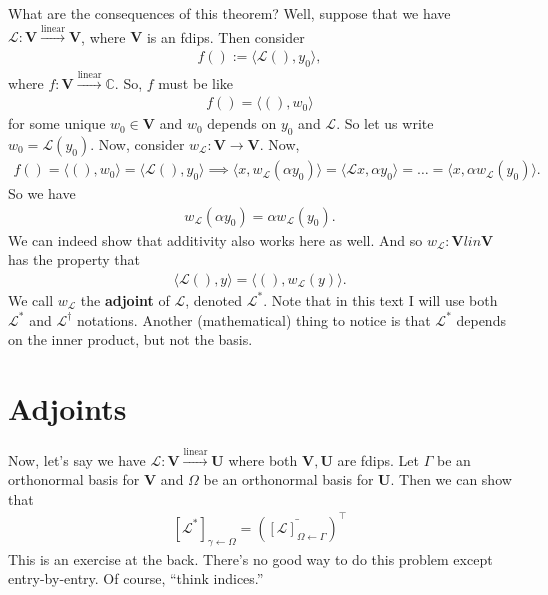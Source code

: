 \documentclass{book}
\theoremstyle{definition}
\newcommand{\C}{\mathbb{C}}
\newcommand{\V}{\mathbf{V}}
\newcommand{\U}{\mathbf{U}}
\newcommand{\lag}{\mathcal{L}}
\newcommand{\lin}{\overset{\text{linear}}{\longrightarrow}}
\newcommand{\la}{\langle}
\newcommand{\ra}{\rangle}
\newcommand{\lp}{\left(}
\newcommand{\rp}{\right)}
\begin{document}
What are the consequences of this theorem? Well, suppose that  we have $\lag : \V \lin \V$, where $\V$ is an fdips. Then consider
\begin{align*}
f() := \la \lag(), y_0 \ra,
\end{align*}
where $f:\V \lin \C$. So, $f$ must be like 
\begin{align*}
f() = \la (),w_0 \ra
\end{align*}
for some unique $w_0 \in \V$ and $w_0$ depends on $y_0$ and $\lag$. So let us write $w_0 = \lag(y_0)$. Now, consider $w_\lag : \V \to \V$. Now,
\begin{align*}
f() = \la (),w_0 \ra = \la \lag(), y_0\ra \implies \la x,w_\lag(\alpha y_0) \ra = \la \lag x, \alpha y_0 \ra = \dots = \la x,\alpha w_\lag(y_0) \ra.
\end{align*}
So we have
\begin{align*}
w_\lag(\alpha y_0) = \alpha w_\lag(y_0).
\end{align*}
We can indeed show that additivity also works here as well. And so $w_\lag : \V lin \V$ has the property that 
\begin{align*}
\la \lag(), y\ra = \la (), w_\lag(y) \ra.
\end{align*}
We call $w_\lag$ the \textbf{adjoint} of $\lag$, denoted $\lag^*$. Note that in this text I will use both $\lag^*$ and $\lag^\dagger$ notations. Another (mathematical) thing to notice is that $\lag^*$ depends on the inner product, but not the basis. 














\section{Adjoints}




Now, let's say we have $\lag : \V \lin \U$ where both $\V,\U$ are fdips. Let $\Gamma$ be an orthonormal basis for $\V$ and $\Omega$ be an orthonormal basis for $\U$. Then we can show that
\begin{align*}
\boxed{[\lag^*]_{\gamma\leftarrow\Omega} = \lp \bar{[\lag]_{\Omega\leftarrow\Gamma}} \rp^\top}
\end{align*}
This is an exercise at the back. There's no good way to do this problem except entry-by-entry. Of course, ``think indices.''
\end{document}
